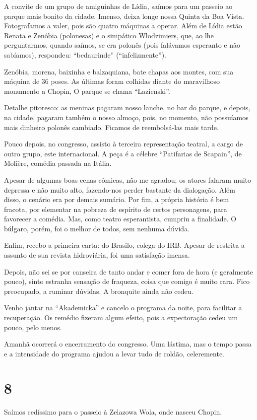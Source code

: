 A convite de um grupo de amiguinhas de Lídia, saímos para um passeio ao parque mais bonito da cidade. Imenso, deixa longe nossa Quinta da Boa Vista. Fotografamos a valer, pois são quatro máquinas a operar. Além de Lídia estão Renata e Zenóbia (polonesas) e o simpático Wlodzimiers, que, ao lhe perguntarmos, quando saímos, se era polonês (pois falávamos esperanto e não sabíamos), respondeu: ``bedaurinde'' (``in\-fe\-liz\-men\-te'').

Zenóbia, morena, baixinha e balzaquiana, bate chapas aos montes, com sua máquina de 36 poses. As últimas foram colhidas diante do maravilhoso monumento a Chopin, O parque se chama ``Lazienski''.

Detalhe pitoresco: as meninas pagaram nosso lanche, no bar do parque, e depois, na cidade, pagaram também o nosso almoço, pois, no momento, não possuíamos mais dinheiro polonês cambiado. Ficamos de reembolsá-las mais tarde.

Pouco depois, no congresso, assisto à terceira representação teatral, a cargo de outro grupo, este internacional. A peça é a célebre ``Patifarias de Scapain'', de Molière, comédia passada na Itália.

Apesar de algumas boas cenas cômicas, não me agradou; os atores falaram muito depressa e não muito alto, fazendo-nos perder bastante da dialogação. Além disso, o cenário era por demais sumário. Por fim, a própria história é bem fracota, por elementar na pobreza de espírito de certos personagens, para favorecer a comédia. Mas, como teatro esperantista, cumpriu a finalidade. O búlgaro, porém, foi o melhor de todos, sem nenhuma dúvida.

Enfim, recebo a primeira carta: do Brasilo, colega do IRB. Apesar de restrita a assunto de sua revista hidroviária, foi uma satisfação imensa.

Depois, não sei se por canseira de tanto andar e comer fora de hora (e geralmente pouco), sinto estranha sensação de fraqueza, coisa que comigo é muito rara. Fico preocupado, a ruminar dúvidas. A bronquite ainda não cedeu.

Venho jantar na ``Akademicka'' e cancelo o programa da noite, para facilitar a recuperação. Os remédio fizeram algum efeito, pois a expectoração cedeu um pouco, pelo menos.

Amanhã ocorrerá o encerramento do congresso. Uma lástima, mas o tempo passa e a intensidade do programa ajudou a levar tudo de roldão, celeremente.

\section*{8 \adfflatleafright {}}
Saímos cedíssimo para o passeio à Zelazowa Wola, onde nasceu Chopin.

